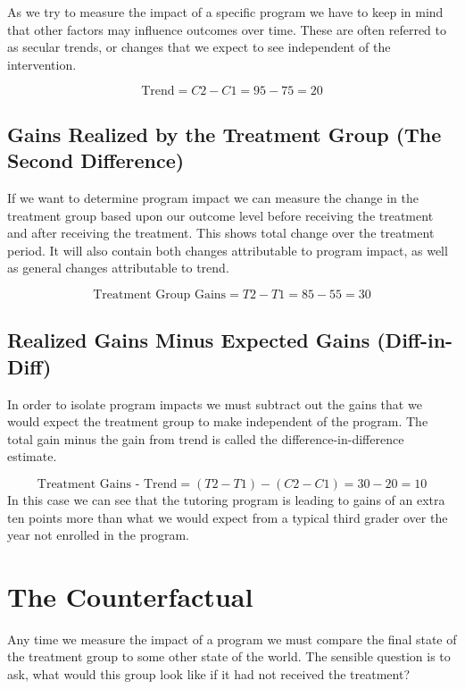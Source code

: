 \documentclass[]{book}
\theoremstyle{definition}
\theoremstyle{definition}
\theoremstyle{definition}
\theoremstyle{remark}
\begin{document}
As we try to measure the impact of a specific program we have to keep in
mind that other factors may influence outcomes over time. These are
often referred to as secular trends, or changes that we expect to see
independent of the intervention.

\[ \textrm{Trend} = C2 - C1 = 95 - 75 = 20 \]

\hypertarget{gains-realized-by-the-treatment-group-the-second-difference}{%
\subsection{Gains Realized by the Treatment Group (The Second
Difference)}\label{gains-realized-by-the-treatment-group-the-second-difference}}

If we want to determine program impact we can measure the change in the
treatment group based upon our outcome level before receiving the
treatment and after receiving the treatment. This shows total change
over the treatment period. It will also contain both changes
attributable to program impact, as well as general changes attributable
to trend.

\[ \textrm{Treatment Group Gains} = T2 - T1 = 85 - 55 = 30\]

\hypertarget{realized-gains-minus-expected-gains-diff-in-diff}{%
\subsection{Realized Gains Minus Expected Gains
(Diff-in-Diff)}\label{realized-gains-minus-expected-gains-diff-in-diff}}

In order to isolate program impacts we must subtract out the gains that
we would expect the treatment group to make independent of the program.
The total gain minus the gain from trend is called the
difference-in-difference estimate.

\[ \textrm{Treatment Gains - Trend} = (T2 - T1) - (C2 - C1) = 30 - 20 = 10 \]
In this case we can see that the tutoring program is leading to gains of
an extra ten points more than what we would expect from a typical third
grader over the year not enrolled in the program.

\hypertarget{the-counterfactual}{%
\section{The Counterfactual}\label{the-counterfactual}}

Any time we measure the impact of a program we must compare the final
state of the treatment group to some other state of the world. The
sensible question is to ask, what would this group look like if it had
not received the treatment?
\end{document}
